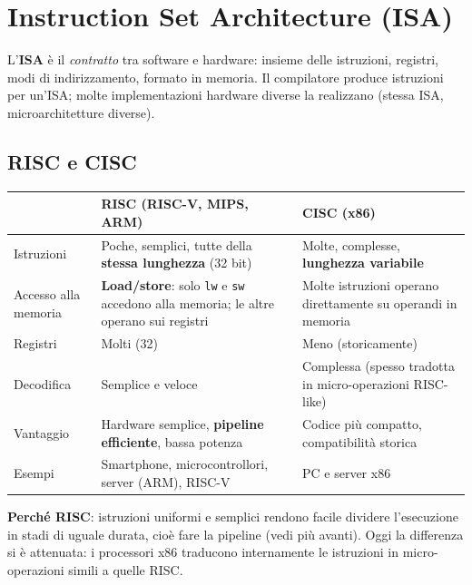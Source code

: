 \section{Instruction Set Architecture (ISA)}
L'\textbf{ISA} è il \emph{contratto} tra software e hardware: insieme delle istruzioni, registri, modi di indirizzamento, formato in memoria. Il compilatore produce istruzioni per un'ISA; molte implementazioni hardware diverse la realizzano (stessa ISA, microarchitetture diverse).

\subsection{RISC e CISC}
\begin{center}
\small
\begin{tabularx}{\textwidth}{@{}>{\raggedright\arraybackslash}p{3.1cm}XX@{}}
\toprule
 & \textbf{RISC} (RISC-V, MIPS, ARM) & \textbf{CISC} (x86) \\
\midrule
Istruzioni & Poche, semplici, tutte della \textbf{stessa lunghezza} (32 bit) & Molte, complesse, \textbf{lunghezza variabile} \\
Accesso alla memoria & \textbf{Load/store}: solo \texttt{lw} e \texttt{sw} accedono alla memoria; le altre operano sui registri & Molte istruzioni operano direttamente su operandi in memoria \\
Registri & Molti (32) & Meno (storicamente) \\
Decodifica & Semplice e veloce & Complessa (spesso tradotta in micro-operazioni RISC-like) \\
Vantaggio & Hardware semplice, \textbf{pipeline efficiente}, bassa potenza & Codice più compatto, compatibilità storica \\
Esempi & Smartphone, microcontrollori, server (ARM), RISC-V & PC e server x86 \\
\bottomrule
\end{tabularx}
\end{center}
\textbf{Perché RISC}: istruzioni uniformi e semplici rendono facile dividere l'esecuzione in stadi di uguale durata, cioè fare la pipeline (vedi più avanti). Oggi la differenza si è attenuata: i processori x86 traducono internamente le istruzioni in micro-operazioni simili a quelle RISC.

